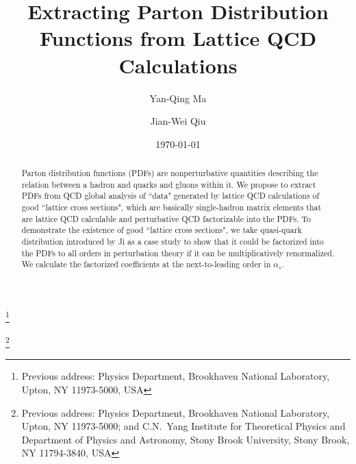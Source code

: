 \documentclass[twocolumn,aps,prl,superscriptaddress,nofootinbib,showpacs]{revtex4-1}
\begin{document}
\title{Extracting Parton Distribution Functions from Lattice QCD Calculations}

\author{Yan-Qing Ma}
\thanks{Previous address: Physics Department,
                 Brookhaven National Laboratory, Upton, NY 11973-5000, USA}
\author{Jian-Wei Qiu}
\thanks{Previous address: Physics Department,
                 Brookhaven National Laboratory, Upton, NY 11973-5000; and
                 C.N.\ Yang Institute for Theoretical Physics
		and Department of Physics and Astronomy,
             	Stony Brook University, Stony Brook, NY 11794-3840, USA}

\date{\today}

\begin{abstract}
Parton distribution functions (PDFs) are nonperturbative quantities describing the relation between a hadron and  quarks and gluons within it.  We propose to extract PDFs from QCD global analysis of  ``data" generated by lattice QCD calculations of good ``lattice cross sections", which are basically single-hadron matrix elements that are lattice QCD calculable and perturbative QCD factorizable into the PDFs. To demonstrate the existence of good ``lattice cross sections", we take quasi-quark distribution introduced by Ji \cite{Ji:2013dva} as a case study to show that it could be factorized into the PDFs to all orders in perturbation theory if it can be multiplicatively renormalized.  We calculate the factorized coefficients at the next-to-leading order in $\alpha_s$.
\end{abstract}

\maketitle
\allowdisplaybreaks
\end{document}

